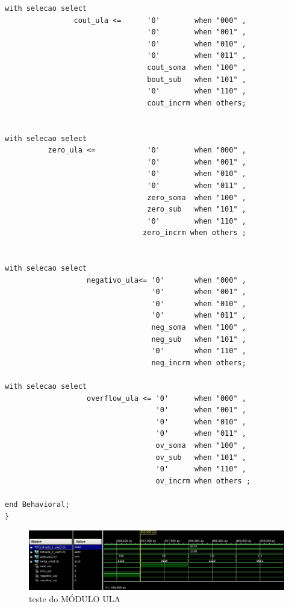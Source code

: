 \documentclass[a4paper,12pt,twoside]{article}
\begin{document}
\begin{lstlisting}
with selecao select
                cout_ula <=      '0'        when "000" ,
                                 '0'        when "001" ,
                                 '0'        when "010" ,
                                 '0'        when "011" ,
                                 cout_soma  when "100" ,
                                 bout_sub   when "101" ,
                                 '0'        when "110" ,
                                 cout_incrm when others;
		

with selecao select
          zero_ula <=            '0'        when "000" ,
                                 '0'        when "001" ,
                                 '0'        when "010" ,
                                 '0'        when "011" ,
                                 zero_soma  when "100" ,
                                 zero_sub   when "101" ,
                                 '0'        when "110" ,
                                zero_incrm when others ;


with selecao select
                   negativo_ula<= '0'       when "000" ,
                                  '0'       when "001" ,
                                  '0'       when "010" ,
                                  '0'       when "011" ,
                                  neg_soma  when "100" ,
                                  neg_sub   when "101" ,
                                  '0'       when "110" ,
                                  neg_incrm when others;
											
with selecao select
                   overflow_ula <= '0'      when "000" ,
                                   '0'      when "001" ,
                                   '0'      when "010" ,
                                   '0'      when "011" ,
                                   ov_soma  when "100" ,
                                   ov_sub   when "101" ,
                                   '0'      when "110" ,
                                   ov_incrm when others ;

end Behavioral;
} \end{lstlisting}

  \begin{figure}[H]
\centering
\includegraphics[scale=0.6]{testes/ula2.jpeg}
\caption{teste do MÓDULO ULA}
\label{fig:diagrama}
\end{figure}
\end{document}
